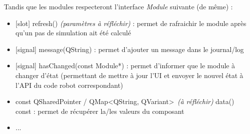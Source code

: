 Tandis que les modules respecteront l'interface \emph{Module} suivante (de même) :
\begin{itemize}
    \item $[$slot$]$ refresh() \emph{(paramètres à réfléchir)} : permet de rafraichir le module après qu'un pas de simulation ait été calculé
    \item $[$signal$]$ message(QString) : permet d'ajouter un message dans le journal/log
    \item $[$signal$]$ hasChanged(const Module*) : permet d'informer que le module à changer d'état (permettant de mettre à jour l'UI et envoyer le nouvel état à l'API du code robot correspondant)
    \item const QSharedPointer / QMap\textless QString, QVariant\textgreater\ \emph{(à réfléchir)} data() const : permet de récupérer la/les valeurs du composant
    \item ...
\end{itemize}




